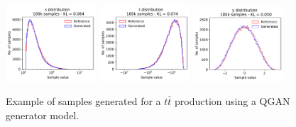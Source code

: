 \documentclass[twocolumn,preprintnumbers,superscriptaddress]{revtex4-2}
\begin{document}
\begin{figure}
  \includegraphics[width=0.3\textwidth]{plots/LHCttbar/s-distribution_LHCdata_100k.pdf}%
  \includegraphics[width=0.3\textwidth]{plots/LHCttbar/t-distribution_LHCdata_100k.pdf}%
  \includegraphics[width=0.3\textwidth]{plots/LHCttbar/y-distribution_LHCdata_100k.pdf}

  \caption{\label{fig:3dgauss}Example of samples generated for a $t\bar{t}$
    production using a QGAN generator model.}
\end{figure}
\end{document}
